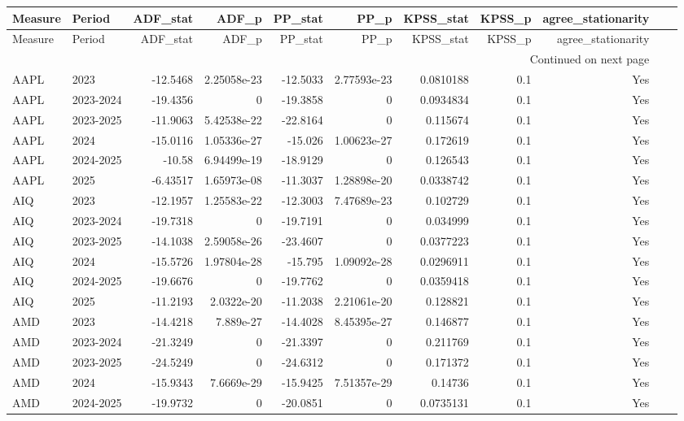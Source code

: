 \begin{longtable}{llrrrrrrrrl}
\toprule
Measure & Period & ADF_stat & ADF_p & PP_stat & PP_p & KPSS_stat & KPSS_p & agree_stationarity \\
\midrule
\endfirsthead
\toprule
Measure & Period & ADF_stat & ADF_p & PP_stat & PP_p & KPSS_stat & KPSS_p & agree_stationarity \\
\midrule
\endhead
\midrule
\multicolumn{9}{r}{Continued on next page} \\
\midrule
\endfoot
\bottomrule
\endlastfoot
AAPL & 2023 & -12.5468 & 2.25058e-23 & -12.5033 & 2.77593e-23 & 0.0810188 & 0.1 & Yes \\
AAPL & 2023-2024 & -19.4356 & 0 & -19.3858 & 0 & 0.0934834 & 0.1 & Yes \\
AAPL & 2023-2025 & -11.9063 & 5.42538e-22 & -22.8164 & 0 & 0.115674 & 0.1 & Yes \\
AAPL & 2024 & -15.0116 & 1.05336e-27 & -15.026 & 1.00623e-27 & 0.172619 & 0.1 & Yes \\
AAPL & 2024-2025 & -10.58 & 6.94499e-19 & -18.9129 & 0 & 0.126543 & 0.1 & Yes \\
AAPL & 2025 & -6.43517 & 1.65973e-08 & -11.3037 & 1.28898e-20 & 0.0338742 & 0.1 & Yes \\
AIQ & 2023 & -12.1957 & 1.25583e-22 & -12.3003 & 7.47689e-23 & 0.102729 & 0.1 & Yes \\
AIQ & 2023-2024 & -19.7318 & 0 & -19.7191 & 0 & 0.034999 & 0.1 & Yes \\
AIQ & 2023-2025 & -14.1038 & 2.59058e-26 & -23.4607 & 0 & 0.0377223 & 0.1 & Yes \\
AIQ & 2024 & -15.5726 & 1.97804e-28 & -15.795 & 1.09092e-28 & 0.0296911 & 0.1 & Yes \\
AIQ & 2024-2025 & -19.6676 & 0 & -19.7762 & 0 & 0.0359418 & 0.1 & Yes \\
AIQ & 2025 & -11.2193 & 2.0322e-20 & -11.2038 & 2.21061e-20 & 0.128821 & 0.1 & Yes \\
AMD & 2023 & -14.4218 & 7.889e-27 & -14.4028 & 8.45395e-27 & 0.146877 & 0.1 & Yes \\
AMD & 2023-2024 & -21.3249 & 0 & -21.3397 & 0 & 0.211769 & 0.1 & Yes \\
AMD & 2023-2025 & -24.5249 & 0 & -24.6312 & 0 & 0.171372 & 0.1 & Yes \\
AMD & 2024 & -15.9343 & 7.6669e-29 & -15.9425 & 7.51357e-29 & 0.14736 & 0.1 & Yes \\
AMD & 2024-2025 & -19.9732 & 0 & -20.0851 & 0 & 0.0735131 & 0.1 & Yes \\

\end{longtable}
